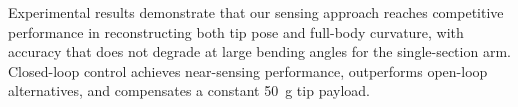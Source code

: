 Experimental results demonstrate that our sensing approach reaches competitive performance in reconstructing both tip pose and full-body curvature, with accuracy that does not degrade at large bending angles for the single-section arm. Closed-loop control achieves near-sensing performance, outperforms open-loop alternatives, and compensates a constant 50~g tip payload.
